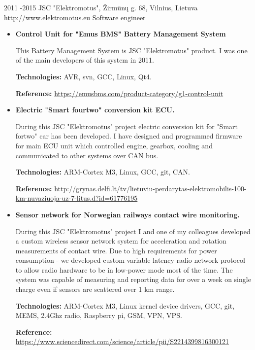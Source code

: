 \documentclass[12]{article}
\begin{document}
\job
{2011 -}{2015}
{JSC "Elektromotus", Žirmūnų g. 68, Vilnius, Lietuva}
{http://www.elektromotus.eu}
{Software engineer}
{}
\begin{itemize}[leftmargin=2cm,topsep=-0.5cm]

\item \textbf{Control Unit for "Emus BMS" Battery Management System}

This Battery Management System is JSC "Elektromotus" product.
I was one of the main developers of this system in 2011.

\rule{0mm}{5mm}\textbf{Technologies:} AVR, svn, GCC, Linux, Qt4.

\rule{0mm}{5mm}\textbf{Reference:} \url{https://emusbms.com/product-category/g1-control-unit}

\item \textbf{Electric "Smart fourtwo" conversion kit ECU.}

During this JSC "Elektromotus" project electric conversion kit for "Smart fortwo" car has been developed.
I have designed and programmed firmware for main ECU unit which controlled engine, gearbox, cooling and communicated to other systems over CAN bus.

\rule{0mm}{5mm}\textbf{Technologies:} ARM-Cortex M3, Linux, GCC, git, CAN.

\rule{0mm}{5mm}\textbf{Reference:} \url{http://grynas.delfi.lt/tv/lietuviu-perdarytas-elektromobilis-100-km-nuvaziuoja-uz-7-litus.d?id=61776195}

\item \textbf{Sensor network for Norwegian railways contact wire monitoring.}

During this JSC "Elektromotus" project I and one of my colleagues developed a custom wireless sensor network system for acceleration and rotation measurements of contact wire.
Due to high requirements for power consumption - we developed custom variable latency radio network protocol to allow radio hardware to be in low-power mode most of the time.
The system was capable of measuring and reporting data for over a week on single charge even if sensors are scattered over 1 km range.

\rule{0mm}{5mm}\textbf{Technologies:} ARM-Cortex M3, Linux kernel device drivers, GCC, git, MEMS, 2.4Ghz radio, Raspberry pi, GSM, VPN, VPS.

\rule{0mm}{5mm}\textbf{Reference:} \url{https://www.sciencedirect.com/science/article/pii/S2214399816300121}

\end{itemize}
\end{document}
